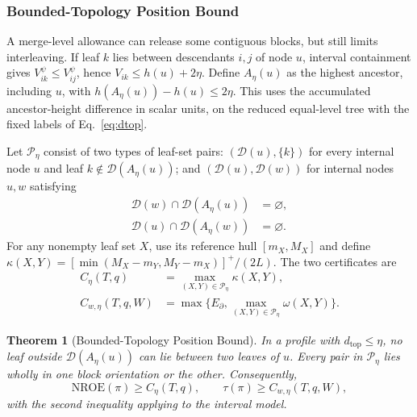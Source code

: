 \documentclass[review]{vgtc}
\newtheorem{theorem}{Theorem}
\newcommand{\dtop}{d_{\mathrm{top}}}
\newcommand{\nroe}{\mathrm{NROE}}
\begin{document}


\subsubsection{Bounded-Topology Position Bound}
A merge-level allowance can release some contiguous blocks, but still limits interleaving. If leaf $k$ lies between descendants $i,j$ of node $u$, interval containment gives $V_{ik}^{\psi}\le V_{ij}^{\psi}$, hence $V_{ik}\le h(u)+2\eta$. Define $A_\eta(u)$ as the highest ancestor, including $u$, with $h(A_\eta(u))-h(u)\le2\eta$. This uses the accumulated ancestor-height difference in scalar units, on the reduced equal-level tree with the fixed labels of Eq.~\ref{eq:dtop}.

Let $\mathcal{P}_\eta$ consist of two types of leaf-set pairs: $(\mathcal{D}(u),\{k\})$ for every internal node $u$ and leaf $k\notin\mathcal{D}(A_\eta(u))$; and $(\mathcal{D}(u),\mathcal{D}(w))$ for internal nodes $u,w$ satisfying
\begin{equation}\label{eq:separatedpairs}
\begin{aligned}
 \mathcal{D}(w)\cap\mathcal{D}(A_\eta(u))&=\varnothing,\\
 \mathcal{D}(u)\cap\mathcal{D}(A_\eta(w))&=\varnothing.
\end{aligned}
\end{equation}
For any nonempty leaf set $X$, use its reference hull $[m_X,M_X]$ and define $\kappa(X,Y)=[\min(M_X-m_Y,M_Y-m_X)]^+/(2L)$. The two certificates are
\begin{equation}\label{eq:chaindef}
\begin{aligned}
 C_\eta(T,q)&=\max_{(X,Y)\in\mathcal{P}_\eta}\kappa(X,Y),\\
 C_{w,\eta}(T,q,W)&=\max\{E_\partial,\max_{(X,Y)\in\mathcal{P}_\eta}\omega(X,Y)\}.
\end{aligned}
\end{equation}
\begin{theorem}[Bounded-Topology Position Bound]\label{thm:chain}
In a profile with $\dtop\le\eta$, no leaf outside $\mathcal{D}(A_\eta(u))$ can lie between two leaves of $u$. Every pair in $\mathcal{P}_\eta$ lies wholly in one block orientation or the other. Consequently,
\begin{equation}\label{eq:chainbounds}
 \nroe(\pi)\ge C_\eta(T,q),\qquad
 \tau(\pi)\ge C_{w,\eta}(T,q,W),
\end{equation}
with the second inequality applying to the interval model.
\end{theorem}
\end{document}

